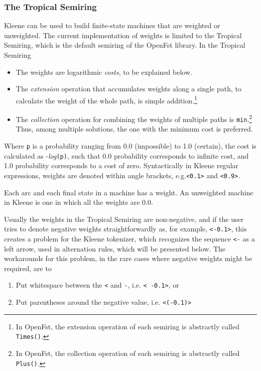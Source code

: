 \subsubsection{The Tropical Semiring}  

Kleene can be used to build finite-state machines that are weighted or unweighted.
The current implementation of weights is limited to the
Tropical Semiring, which is the default semiring of the OpenFst library.
In the Tropical Semiring

\begin{itemize}
\item
The weights are logarithmic \emph{costs}, to be explained below.
\item
The \emph{extension} operation that accumulates weights along a single
path, to calculate the weight of the whole path, is simple addition.\footnote{In OpenFst, the extension operation of
each
semiring is abstractly called \texttt{Times()}.}
\item
The \emph{collection} operation for combining the weights of multiple
paths is \texttt{min}.\footnote{In OpenFst, the collection
operation of each semiring is abstractly called \texttt{Plus()}.}
Thus, among multiple solutions, the one with the minimum cost is preferred.
\end{itemize}

\noindent
Where \texttt{p} is a probability ranging from 0.0 (impossible) to
1.0 (certain), the cost is calculated as -\emph{log}\texttt{(p)},
such that 0.0 probability corresponds to infinite cost, and 1.0
probability corresponds to a cost of zero.
Syntactically in Kleene regular expressions, weights are denoted within angle brackets,
e.g.\@ \texttt{<0.1>} and \texttt{<0.9>}. 

Each arc and each final state in a machine has a weight.  An unweighted
machine in Kleene is one in which all the weights are 0.0.

Usually the weights in
the Tropical Semiring are non-negative, and if the user tries to
denote negative weights straightforwardly as, for example, \@ \texttt{<-0.1>}, this
creates a problem for the Kleene tokenizer, which recognizes the
sequence \texttt{<-} as a left arrow, used in alternation rules, which
will be presented below.
The workarounds for this problem, in the rare cases where negative
weights might be required,
are to

\begin{enumerate}
\item
Put whitespace between the \texttt{<} and \texttt{-}, i.e.\@
\texttt{< -0.1>}, or
\item
Put parentheses around the negative value, i.e.\@
\texttt{<(-0.1)>}
\end{enumerate}

